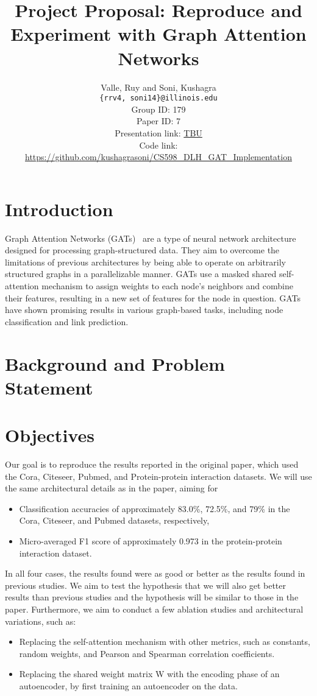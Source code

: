 \documentclass{article}
\title{Project Proposal: Reproduce and Experiment with Graph Attention Networks}
\author
{Valle, Ruy and Soni, Kushagra \\
    \texttt{\{rrv4, soni14\}@illinois.edu}
    \\[2em]
    Group ID: 179\\
    Paper ID: 7\\
    Presentation link: \url{TBU} \\
    Code link: \url{https://github.com/kushagrasoni/CS598_DLH_GAT_Implementation}
    \\[2em]
}
\begin{document}
    \maketitle

    \section{Introduction}\label{sec:introduction}

    Graph Attention Networks (GATs)~\cite{velickovic2018graph} are a type of neural network architecture designed for
    processing graph-structured data.
    They aim to overcome the limitations of previous architectures by being able to operate on arbitrarily structured graphs in a parallelizable manner.
    GATs use a masked shared self-attention mechanism to assign weights to each node's neighbors and combine their features, resulting in a new set of features for the node in question.
    GATs have shown promising results in various graph-based tasks, including node classification and link prediction.


    \section{Background and Problem Statement}\label{sec:background-and-problem-statement}
    

    \section{Objectives}\label{sec:objectives}
    Our goal is to reproduce the results reported in the original paper, which used the Cora, Citeseer, Pubmed, and Protein-protein interaction datasets.
    We will use the same architectural details as in the paper, aiming for
    \begin{itemize}
        \item Classification accuracies of approximately 83.0\%, 72.5\%, and 79\% in the Cora, Citeseer, and Pubmed
        datasets, respectively,
        \item Micro-averaged F1 score of approximately 0.973 in the protein-protein interaction dataset.
    \end{itemize}

    In all four cases, the results found were as good or better as the results found in previous studies.
    We aim to test the hypothesis that we will also get better results than previous studies and the hypothesis will
    be similar to those in the paper.
    Furthermore, we aim to conduct a few ablation studies and architectural
    variations, such as:
    \begin{itemize}
        \item Replacing the self-attention mechanism with other metrics, such as
    constants, random weights, and Pearson and Spearman correlation
    coefficients.
        \item Replacing the shared weight matrix W with the encoding phase of an
    autoencoder, by first training an autoencoder on the data.
    \end{itemize}
\end{document}
